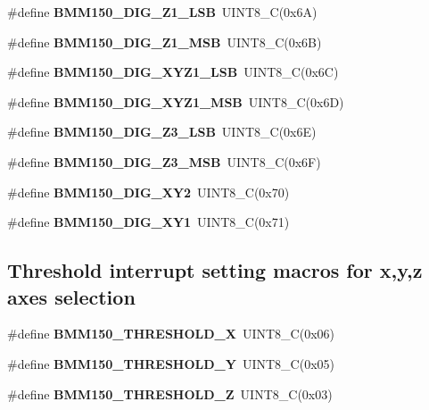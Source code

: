 \begin{DoxyCompactItemize}
\#define {\bfseries B\+M\+M150\+\_\+\+D\+I\+G\+\_\+\+Z1\+\_\+\+L\+SB}~U\+I\+N\+T8\+\_\+C(0x6\+A)
\item 
\mbox{\label{group___b_m_m150_gaa7fc2c149bac3c4c037a900a9ca6151f}} 
\#define {\bfseries B\+M\+M150\+\_\+\+D\+I\+G\+\_\+\+Z1\+\_\+\+M\+SB}~U\+I\+N\+T8\+\_\+C(0x6\+B)
\item 
\mbox{\label{group___b_m_m150_ga4dd67e60e4ca6ceba96c7822abc31a2b}} 
\#define {\bfseries B\+M\+M150\+\_\+\+D\+I\+G\+\_\+\+X\+Y\+Z1\+\_\+\+L\+SB}~U\+I\+N\+T8\+\_\+C(0x6\+C)
\item 
\mbox{\label{group___b_m_m150_gae379d42737c29ce3bdf8a21fa4569364}} 
\#define {\bfseries B\+M\+M150\+\_\+\+D\+I\+G\+\_\+\+X\+Y\+Z1\+\_\+\+M\+SB}~U\+I\+N\+T8\+\_\+C(0x6\+D)
\item 
\mbox{\label{group___b_m_m150_gab9ac3938b949b6200668a9f0b8701920}} 
\#define {\bfseries B\+M\+M150\+\_\+\+D\+I\+G\+\_\+\+Z3\+\_\+\+L\+SB}~U\+I\+N\+T8\+\_\+C(0x6\+E)
\item 
\mbox{\label{group___b_m_m150_ga6b42131d3183394d176bc988f6ef6b36}} 
\#define {\bfseries B\+M\+M150\+\_\+\+D\+I\+G\+\_\+\+Z3\+\_\+\+M\+SB}~U\+I\+N\+T8\+\_\+C(0x6\+F)
\item 
\mbox{\label{group___b_m_m150_gae4930ced79355b8039ded668e72cf241}} 
\#define {\bfseries B\+M\+M150\+\_\+\+D\+I\+G\+\_\+\+X\+Y2}~U\+I\+N\+T8\+\_\+C(0x70)
\item 
\mbox{\label{group___b_m_m150_gafda35398d4e1b971ea8801da17341120}} 
\#define {\bfseries B\+M\+M150\+\_\+\+D\+I\+G\+\_\+\+X\+Y1}~U\+I\+N\+T8\+\_\+C(0x71)
\end{DoxyCompactItemize}
\subsection*{Threshold interrupt setting macros for x,y,z axes selection}
\begin{DoxyCompactItemize}
\item 
\mbox{\label{group___b_m_m150_gacc67ab3ab69ac01c5103473f2fc5fbfd}} 
\#define {\bfseries B\+M\+M150\+\_\+\+T\+H\+R\+E\+S\+H\+O\+L\+D\+\_\+X}~U\+I\+N\+T8\+\_\+C(0x06)
\item 
\mbox{\label{group___b_m_m150_ga40e3722bf5968c28a08a68cfbf8a45ef}} 
\#define {\bfseries B\+M\+M150\+\_\+\+T\+H\+R\+E\+S\+H\+O\+L\+D\+\_\+Y}~U\+I\+N\+T8\+\_\+C(0x05)
\item 
\mbox{\label{group___b_m_m150_ga8eee4adc9c27238b3559a3d120d28ca4}} 
\#define {\bfseries B\+M\+M150\+\_\+\+T\+H\+R\+E\+S\+H\+O\+L\+D\+\_\+Z}~U\+I\+N\+T8\+\_\+C(0x03)
\end{DoxyCompactItemize}

